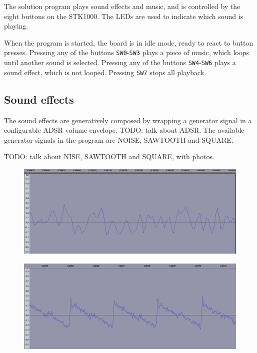 The solution program plays sound effects and music, and is controlled by the eight buttons on the STK1000.
The LEDs are used to indicate which sound is playing.

When the program is started, the board is in idle mode, ready to react to button presses.
Pressing any of the buttons \texttt{SW0}-\texttt{SW3} plays a piece of music, which loops until another sound is selected.
Pressing any of the buttons \texttt{SW4}-\texttt{SW6} plays a sound effect, which is not looped.
Pressing \texttt{SW7} stops all playback.

\subsection{Sound effects}

The sound effects are generatively composed by wrapping a generator signal in a configurable ADSR volume envelope.
TODO: talk about ADSR.
The available generator signals in the program are NOISE, SAWTOOTH and SQUARE.

TODO: talk about NISE, SAWTOOTH and SQUARE, with photos.
\begin{figure}[H]
	\includegraphics[width = \textwidth]{images/SW6zoom.png}
	\caption{}
	\label{img-sw6zoom}
\end{figure}

\begin{figure}[H]
	\includegraphics[width = \textwidth]{images/SW5zoom.png}
	\caption{}
	\label{img-sw5zoom}
\end{figure}

